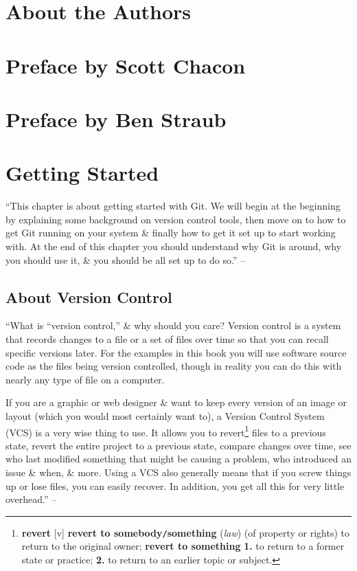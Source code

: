 \documentclass[oneside]{book}
\numberwithin{equation}{section}
\begin{document}
\section*{About the Authors}


\section*{Preface by Scott Chacon}


\section*{Preface by Ben Straub}


\section{Getting Started}
``This chapter is about getting started with Git. We will begin at the beginning by explaining some background on version control tools, then move on to how to get Git running on your system \& finally how to get it set up to start working with. At the end of this chapter you should understand why Git is around, why you should use it, \& you should be all set up to do so.'' -- \cite[p. 1]{Chacon_Straub2014}

\subsection{About Version Control}
``What is ``version control,'' \& why should you care? Version control is a system that records changes to a file or a set of files over time so that you can recall specific versions later. For the examples in this book you will use software source code as the files being version controlled, though in reality you can do this with nearly any type of file on a computer.

If you are a graphic or web designer \& want to keep every version of an image or layout (which you would most certainly want to), a Version Control System (VCS) is a very wise thing to use. It allows you to revert\footnote{\textbf{revert} [v] \textbf{revert to somebody\texttt{/}something} (\textit{law}) (of property or rights) to return to the original owner; \textbf{revert to something} \textbf{1.} to return to a former state or practice; \textbf{2.} to return to an earlier topic or subject.} files to a previous state, revert the entire project to a previous state, compare changes over time, see who last modified something that might be causing a problem, who introduced an issue \& when, \& more. Using a VCS also generally means that if you screw things up or lose files, you can easily recover. In addition, you get all this for very little overhead.'' -- \cite[p. 1]{Chacon_Straub2014}
\end{document}
